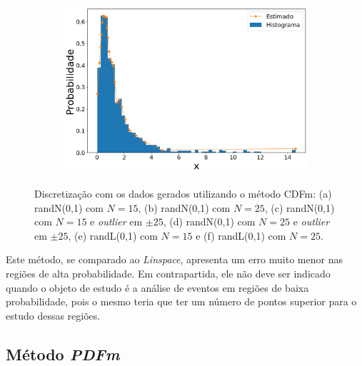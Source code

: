 \begin{figure}[H]
\begin{subfigure}[b]{0.45\textwidth}
		\caption{}
		\label{fig:cdf_lognorm15_data}
	\end{subfigure}
	\hfill
	\begin{subfigure}[b]{0.45\textwidth}
		\centering 
		\includegraphics[width=\linewidth]{./figuras/CDFm_lognormal_25_1000_0}
		\caption{}
		\label{fig:cdf_lognorm25_data}
	\end{subfigure}
	\caption{Discretização com os dados gerados utilizando o método \ac{CDFm}: (a) randN(0,1) com $N = 15$, (b) randN(0,1) com $N = 25$, (c) randN(0,1) com $N = 15$ e \textit{outlier} em $\pm 25$, (d) randN(0,1) com $N = 25$ e \textit{outlier} em $\pm 25$, (e) randL(0,1) com $ N = 15 $ e (f) randL(0,1) com $ N = 25 $.}
	\label{fig:cdf_data}
\end{figure}

Este método, se comparado ao \textit{Linspace}, apresenta um erro muito menor nas regiões de alta probabilidade. Em contrapartida, ele não deve ser indicado quando o objeto de estudo é a análise de eventos em regiões de baixa probabilidade, pois o mesmo teria que ter um número de pontos superior para o estudo dessas regiões.

\subsection{Método \textit{PDFm}}


